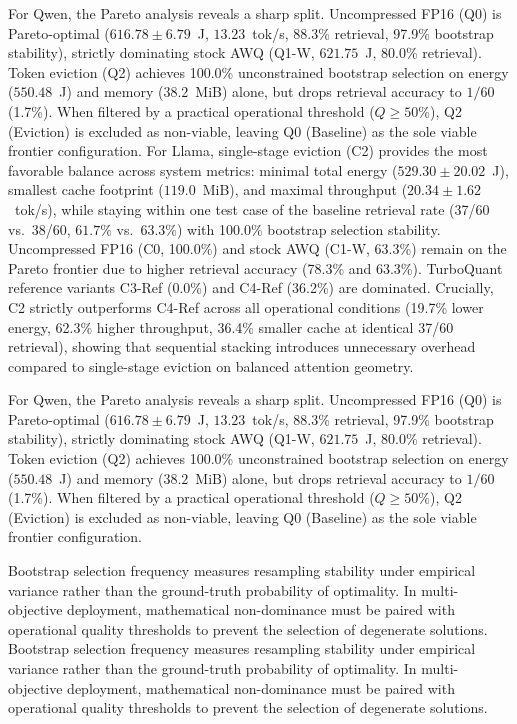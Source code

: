 \documentclass[sigconf,nonacm]{acmart}
\begin{document}
For Qwen, the Pareto analysis reveals a sharp split. Uncompressed FP16 (Q0) is Pareto-optimal ($616.78\pm 6.79$~J, $13.23$~tok/s, 88.3\% retrieval, 97.9\% bootstrap stability), strictly dominating stock AWQ (Q1-W, $621.75$~J, 80.0\% retrieval). Token eviction (Q2) achieves 100.0\% unconstrained bootstrap selection on energy ($550.48$~J) and memory ($38.2$~MiB) alone, but drops retrieval accuracy to $1/60$ (1.7\%). When filtered by a practical operational threshold ($Q \ge 50\%$), Q2 (Eviction) is excluded as non-viable, leaving Q0 (Baseline) as the sole viable frontier configuration.
For Llama, single-stage eviction (C2) provides the most favorable balance across system metrics: minimal total energy ($529.30\pm 20.02$~J), smallest cache footprint ($119.0$~MiB), and maximal throughput ($20.34\pm 1.62$~tok/s), while staying within one test case of the baseline retrieval rate (37/60 vs.\ 38/60, $61.7\%$ vs.\ $63.3\%$) with 100.0\% bootstrap selection stability. Uncompressed FP16 (C0, 100.0\%) and stock AWQ (C1-W, 63.3\%) remain on the Pareto frontier due to higher retrieval accuracy (78.3\% and 63.3\%). TurboQuant reference variants C3-Ref (0.0\%) and C4-Ref (36.2\%) are dominated. Crucially, C2 strictly outperforms C4-Ref across all operational conditions (19.7\% lower energy, 62.3\% higher throughput, 36.4\% smaller cache at identical 37/60 retrieval), showing that sequential stacking introduces unnecessary overhead compared to single-stage eviction on balanced attention geometry.

For Qwen, the Pareto analysis reveals a sharp split. Uncompressed FP16 (Q0) is Pareto-optimal ($616.78\pm 6.79$~J, $13.23$~tok/s, 88.3\% retrieval, 97.9\% bootstrap stability), strictly dominating stock AWQ (Q1-W, $621.75$~J, 80.0\% retrieval). Token eviction (Q2) achieves 100.0\% unconstrained bootstrap selection on energy ($550.48$~J) and memory ($38.2$~MiB) alone, but drops retrieval accuracy to $1/60$ (1.7\%). When filtered by a practical operational threshold ($Q \ge 50\%$), Q2 (Eviction) is excluded as non-viable, leaving Q0 (Baseline) as the sole viable frontier configuration.

Bootstrap selection frequency measures resampling stability under empirical variance rather than the ground-truth probability of optimality. In multi-objective deployment, mathematical non-dominance must be paired with operational quality thresholds to prevent the selection of degenerate solutions.
Bootstrap selection frequency measures resampling stability under empirical variance rather than the ground-truth probability of optimality. In multi-objective deployment, mathematical non-dominance must be paired with operational quality thresholds to prevent the selection of degenerate solutions.
\end{document}
